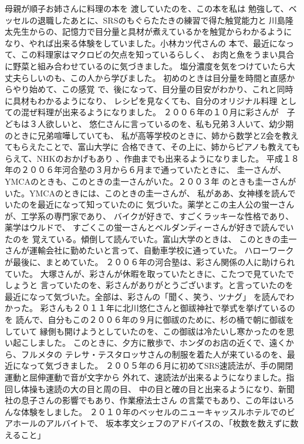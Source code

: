 \documentclass{jsarticle}
\begin{document}
   母親が順子お姉さんに料理の本を
渡していたのを、この本を私は
勉強して、ベッセルの退職したあとに、SRSのもぐらたたきの練習で得た触覚能力と
川島隆太先生からの、記憶力で目分量と具材が煮えているかを触覚からわかるように
なり、やれば出来る体験をしていました。小林カツ代さんの
本で、最近になって、この料理家はマクロビの欠点を知っているらしく、
お肉と魚をうまい具合に野菜と組み合わせているのに気づきました。
塩分濃度を気をつけていたら大丈夫らしいのも、この人から学びました。
初めのときは目分量を時間と直感からやり始めて、この感覚
で、後になって、目分量の目安がわかり、これと同時に具材もわかるようになり、
レシピを見なくても、自分のオリジナル料理
としての混ぜ料理が出来るようになりました。
２００６年の１０月に彩さんが　子どもは３人欲しいと、
悠仁さんに言っているのを、私も兄弟３人いて、幼少期のときに兄弟喧嘩していても、
私が高等学校のときに、姉から数学とZ会を教えてもらえたことで、富山大学に
合格できて、その上に、姉からピアノも教えてもらえて、NHKのおかげもあり
、作曲までも出来るようになりました。
平成１８年の２００６年河合塾の３月から６月まで通っていたときに、
圭一さんが、YMCAのときも、このときの圭一さんがいた。２００３年
のときも圭一さんがいた。YMCAのときには、このときの圭一さんが、
私がああ、女神様を読んでいたのを最近になって知っていたのに
気づいた。薬学とこの主人公の蛍一さんが、工学系の専門家であり、
バイクが好きで、すごくラッキーな性格であり、薬学はウルドで、
すごくこの蛍一さんとベルダンディーさんが好きで読んでいたのを
覚えている。傾倒して読んでいた。富山大学のときは、
このときの圭一さんが運輸会社に勤めたいと言って、自動車学校に通っていた。
ハローワークが最後に、まとめていた。
２００６年の河合塾は、彩さん関係の人に助けられていた。
大塚さんが、彩さんが休暇を取っていたときに、こたつで見ていたでしょうと
言っていたのを、彩さんがありがとうございます。と言っていたのを
最近になって気づいた。全部は、彩さんの「聞く、笑う、ツナグ」
を読んでわかった。
彩さんも２０１１年に北川悠仁さんと御祓神社で挙式を挙げているのを
読んで、自分もこの２００６年の９月に御祓のために、杉の桶で朝に御祓をしていて
縁側も開けようとしていたのを、この御祓は冷たいし寒かったのを思い起こしました。
このときに、夕方に散歩で、ホンダのお店の近くで、遠くから、フルメタの
テレサ・テスタロッサさんの制服を着た人が来ているのを、最近になって気づきました。
２００５年の６月に初めてSRS速読法が、手の開閉運動と屈伸運動で音が文字から
外れて、速読法が出来るようになりました。指回し体操も速読の大の目と周の目、
中の目と確の目と出来るようになり、新聞社の息子さんの影響でもあり、作業療法士さん
の言葉でもあり、この年はいろんな体験をしました。
２０１０年のベッセルのニューキャッスルホテルでのビアホールのアルバイトで、
坂本孝文シェフのアドバイスの、「枚数を数えずに数えること」
\end{document}
